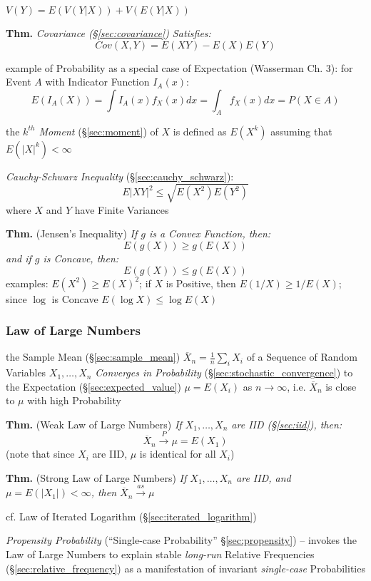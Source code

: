 $V(Y) = E(V(Y|X)) + V(E(Y|X))$

\textbf{Thm.} \emph{Covariance (\S\ref{sec:covariance}) Satisfies:
  \[
    Cov(X,Y) = E(XY) - E(X)E(Y)
  \]
}

example of Probability as a special case of Expectation (Wasserman Ch. 3): for
Event $A$ with Indicator Function $I_A(x)$:
\[
  E(I_A(X)) = \int I_A(x)f_X(x)dx = \int_A f_X(x) dx = P(X \in A)
\]

the \emph{$k^{th}$ Moment} (\S\ref{sec:moment}) of $X$ is defined as $E(X^k)$
assuming that $E(|X|^k) < \infty$

\emph{Cauchy-Schwarz Inequality} (\S\ref{sec:cauchy_schwarz}):
\[
  E|XY|^2 \leq \sqrt{E(X^2)E(Y^2)}
\]
where $X$ and $Y$ have Finite Variances

\textbf{Thm.} (Jensen's Inequality) \emph{
  If $g$ is a Convex Function, then:
  \[
    E(g(X)) \geq g(E(X))
  \]
  and if $g$ is Concave, then:
  \[
    E(g(X)) \leq g(E(X))
  \]
}
examples: $E(X^2) \geq E(X)^2$; if $X$ is Positive, then $E(1/X) \geq 1/E(X)$;
since $\log$ is Concave $E(\log X) \leq \log E(X)$



\subsubsection{Law of Large Numbers}\label{sec:large_numbers}

the Sample Mean (\S\ref{sec:sample_mean})
$\overline{X}_n = \frac{1}{n}\sum_i X_i$ of a Sequence of Random Variables
$X_1, \ldots, X_n$ \emph{Converges in Probability}
(\S\ref{sec:stochastic_convergence}) to the Expectation
(\S\ref{sec:expected_value}) $\mu = E(X_i)$ as $n \to \infty$, i.e.
$\overline{X}_n$ is close to $\mu$ with high Probability

\textbf{Thm.} (Weak Law of Large Numbers) \emph{If $X_1, \ldots, X_n$ are IID
  (\S\ref{sec:iid}), then:
  \[
    \overline{X}_n \xrightarrow{P} \mu = E(X_1)
  \]
}
(note that since $X_i$ are IID, $\mu$ is identical for all $X_i$)

\textbf{Thm.} (Strong Law of Large Numbers) \emph{If $X_1, \ldots, X_n$ are IID,
  and $\mu = E(|X_1|) < \infty$, then $\overline{X}_n \xrightarrow{as} \mu$}

\fist cf. Law of Iterated Logarithm (\S\ref{sec:iterated_logarithm})

\fist \emph{Propensity Probability} (``Single-case Probability''
\S\ref{sec:propensity}) -- invokes the Law of Large Numbers to explain stable
\emph{long-run} Relative Frequencies (\S\ref{sec:relative_frequency}) as a
manifestation of invariant \emph{single-case} Probabilities

